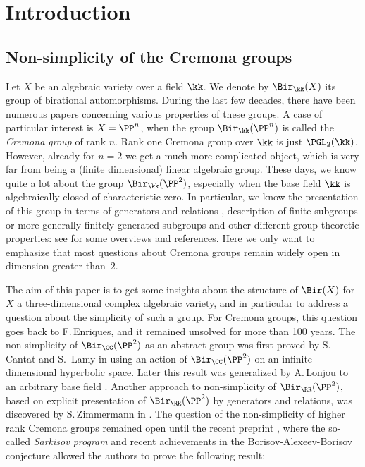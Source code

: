 \section{Introduction}\label{sec:intro}

\subsection{Non-simplicity of the Cremona groups} Let $X$ be an algebraic variety over a field $\kk$. We denote by $\Bir_\kk(X)$ its group of birational automorphisms. During the last few decades, there have been numerous papers concerning various properties of these groups. A case of particular interest is $X=\PP^n$, when the group $\Bir_\kk(\PP^n)$ is called the \emph{Cremona group} of rank $n$. Rank one Cremona group over $\kk$ is just $\PGL_2(\kk)$. However, already for $n=2$ we get a much more complicated object, which is very far from being a (finite dimensional) linear algebraic group. These days, we know quite a lot about the group $\Bir_\kk(\PP^2)$, especially when the base field $\kk$ is algebraically closed of characteristic zero. In particular, we know the presentation of this group in terms of generators and relations \cite{Gizatullin,IKT,UZ}, description of finite subgroups \cite{DI} or more generally finitely generated subgroups and other different group-theoretic properties: see \cite{Cantat13,Deserti19} for some overviews and references. Here we only want to emphasize that most questions about Cremona groups remain widely open in dimension greater than~$2$.

The aim of this paper is to get some insights about the structure of $\Bir(X)$ for $X$ a three-dimensional complex algebraic variety, and in particular to address a question about the simplicity of such a group. For Cremona groups, this question goes back to F.\,Enriques, and it remained unsolved for more than 100 years. The non-simplicity of $\Bir_\CC(\PP^2)$ as an abstract group was first proved by S.\,Cantat and S.~Lamy in \cite{CantatLamy} using an action of $\Bir_\CC(\PP^2)$ on an infinite-dimensional hyperbolic space. Later this result was generalized by A.\,Lonjou to an arbitrary base field \cite{Lonjou}. Another approach to non-simplicity of $\Bir_\RR(\PP^2)$, based on explicit presentation of $\Bir_\RR(\PP^2)$ by generators and relations, was discovered by S.\,Zimmermann in \cite{Zimmermann}. The question of the non-simplicity of higher rank Cremona groups remained open until the recent preprint \cite{BLZ}, where the so-called \emph{Sarkisov program} and recent achievements in the Borisov-Alexeev-Borisov conjecture \cite{BirkarA} allowed the authors to prove the following result:

